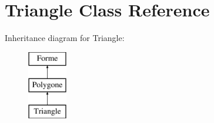 \hypertarget{class_triangle}{}\section{Triangle Class Reference}
\label{class_triangle}
Inheritance diagram for Triangle\+:\begin{figure}[H]
\begin{center}
\leavevmode
\includegraphics[height=3.000000cm]{class_triangle}
\end{center}
\end{figure}
